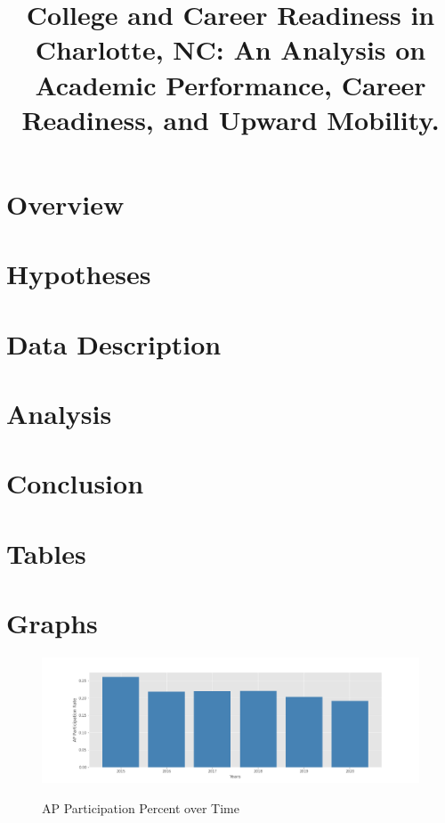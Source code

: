 \documentclass[stu, 12pt, longtable]{apa7}
\title{College and Career Readiness in Charlotte, NC: An Analysis on Academic Performance, Career Readiness, and Upward Mobility.}
\begin{document}
\maketitle

\section{Overview}


\section{Hypotheses}


\section{Data Description}


\section{Analysis}


\section{Conclusion}



\printbibliography

\appendix

\section{Tables}

\newpage




\section{Graphs}
\begin{figure}
    \caption{AP Participation Percent over Time}
    \includegraphics[width=17cm]{AP Participation Rate.png}
    \label{fig1}
\end{figure}
\end{document}
